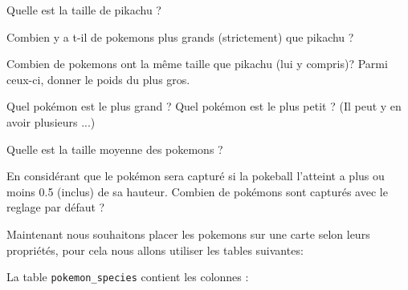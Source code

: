 \question{}
Quelle est la taille de pikachu ?


\question{}
Combien y a t-il de pokemons plus grands (strictement) que pikachu ?


\question{}
Combien de pokemons ont la même taille que pikachu (lui y compris)? Parmi ceux-ci, donner le poids du plus gros.



\question{}
Quel pokémon est le plus grand ? Quel pokémon est le plus petit ? (Il peut y en avoir plusieurs ...)


\question{}
Quelle est la taille moyenne des pokemons ?





\question{}
En considérant que le pokémon sera capturé si la pokeball l'atteint a plus ou moins 0.5 (inclus) de sa hauteur. Combien de pokémons sont capturés avec le reglage par défaut ?

Maintenant nous souhaitons placer les pokemons sur une carte selon leurs propriétés, pour cela nous allons utiliser les tables suivantes:


La table \texttt{pokemon\_species} contient les colonnes :


